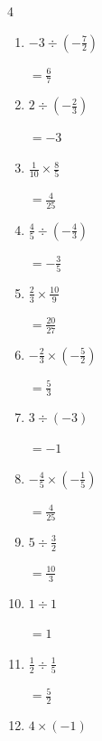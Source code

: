 \begin{multicols}{4}
\begin{enumerate}
        $\displaystyle =-\frac{5}{3}$

  \item $\displaystyle -3\div{}\left(-\frac{7}{2}\right)$

        $\displaystyle =\frac{6}{7}$

  \item $\displaystyle 2\div{}\left(-\frac{2}{3}\right)$

        $\displaystyle =-3$

  \item $\displaystyle \frac{1}{10}\times{}\frac{8}{5}$

        $\displaystyle =\frac{4}{25}$

  \item $\displaystyle \frac{4}{5}\div{}\left(-\frac{4}{3}\right)$

        $\displaystyle =-\frac{3}{5}$

  \item $\displaystyle \frac{2}{3}\times{}\frac{10}{9}$

        $\displaystyle =\frac{20}{27}$

  \item $\displaystyle -\frac{2}{3}\times{}\left(-\frac{5}{2}\right)$

        $\displaystyle =\frac{5}{3}$

  \item $\displaystyle 3\div{}\left(-3\right)$

        $\displaystyle =-1$

\columnbreak %

  \item $\displaystyle -\frac{4}{5}\times{}\left(-\frac{1}{5}\right)$

        $\displaystyle =\frac{4}{25}$

  \item $\displaystyle 5\div{}\frac{3}{2}$

        $\displaystyle =\frac{10}{3}$

  \item $\displaystyle 1\div{}1$

        $\displaystyle =1$

  \item $\displaystyle \frac{1}{2}\div{}\frac{1}{5}$

        $\displaystyle =\frac{5}{2}$

  \item $\displaystyle 4\times{}\left(-1\right)$


\end{enumerate}
\end{multicols}
